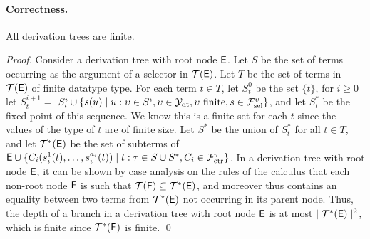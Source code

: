 \paragraph{Correctness.}

\begin{lemma}[Termination]%
\label{lem:t}%
\afterDot
All derivation trees are finite.
\end{lemma}
\begin{proof}
Consider a derivation tree with root node $\mathsf{E}$.
Let $S$ be the set of terms occurring as the argument of a selector in $\mathcal{T}(\mathsf{E})$.
Let $T$ be the set of terms in $\mathcal{T}(\mathsf{E})$ of finite datatype type.
For each term $t \in T$,
let $S^0_t$ be the set $\{ t \}$,
for $i \geq 0$ let $S^{i+1}_t =$ $S^i_t \cup \{ s( u ) \mid u : \upsilon \in S^i, \upsilon \in \mathcal{Y}_{\mathrm{dt}}, \upsilon \text{ finite}, s \in \mathcal{F}_{\mathrm{sel}}^{\upsilon}  \}$,
and let $S^\ast_t$ be the fixed point of this sequence.
We know this is a finite set for each $t$ since the values of the type of $t$ are of finite size.
Let $S^\ast$ be the union of $S^\ast_t$ for all $t \in T$,
and let $\mathcal{T}^\ast(\mathsf{E})$ be the set of subterms of $\mathsf{E} \cup \{ C_i( s^1_i( t ), \ldots, s^{a_i}_i( t ) ) \mid t : \tau \in S \cup S^\ast, C_i \in \mathcal{F}_{\mathrm{ctr}}^\tau \}$.
In a derivation tree with root node $\mathsf{E}$, 
it can be shown by case analysis on the rules of the calculus that each non-root node $\mathsf{F}$ is such that 
$\mathcal{T}(\mathsf{F}) \subseteq \mathcal{T}^\ast(\mathsf{E})$, and moreover thus contains an equality between two terms from $\mathcal{T}^\ast(\mathsf{E})$ not occurring in its parent node.
Thus, the depth of a branch in a derivation tree with root node $\mathsf{E}$ is at most $\mid \mathcal{T}^\ast(\mathsf{E}) \mid^2$,
which is finite since $\mathcal{T}^\ast(\mathsf{E})$ is finite.
\qed
\end{proof}

